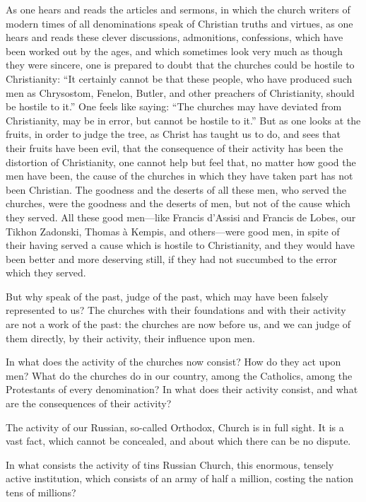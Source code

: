 \documentclass{book}
\begin{document}
As one hears and reads the articles and sermons, in which the church writers of modern times of all denominations speak of Christian truths and virtues, as one hears and reads these clever discussions, admonitions, confessions, which have been worked out by the ages, and which sometimes look very much as though they were sincere, one is prepared to doubt that the churches could be hostile to Christianity: “It certainly cannot be that these people, who have produced such men as Chrysostom, Fenelon, Butler, and other preachers of Christianity, should be hostile to it.” One feels like saying: “The churches may have deviated from Christianity, may be in error, but cannot be hostile to it.” But as one looks at the fruits, in order to judge the tree, as Christ has taught us to do, and sees that their fruits have been evil, that the consequence of their activity has been the distortion of Christianity, one cannot help but feel that, no matter how good the men have been, the cause of the churches in which they have taken part has not been Christian. The goodness and the deserts of all these men, who served the churches, were the goodness and the deserts of men, but not of the cause which they served. All these good men—like Francis d’Assisi and Francis de Lobes, our Tikhon Zadonski, Thomas à Kempis, and others—were good men, in spite of their having served a cause which is hostile to Christianity, and they would have been better and more deserving still, if they had not succumbed to the error which they served.

But why speak of the past, judge of the past, which may have been falsely represented to us? The churches with their foundations and with their activity are not a work of the past: the churches are now before us, and we can judge of them directly, by their activity, their influence upon men.

In what does the activity of the churches now consist? How do they act upon men? What do the churches do in our country, among the Catholics, among the Protestants of every denomination? In what does their activity consist, and what are the consequences of their activity?

The activity of our Russian, so-called Orthodox, Church is in full sight. It is a vast fact, which cannot be concealed, and about which there can be no dispute.

In what consists the activity of tins Russian Church, this enormous, tensely active institution, which consists of an army of half a million, costing the nation tens of millions?
\end{document}
